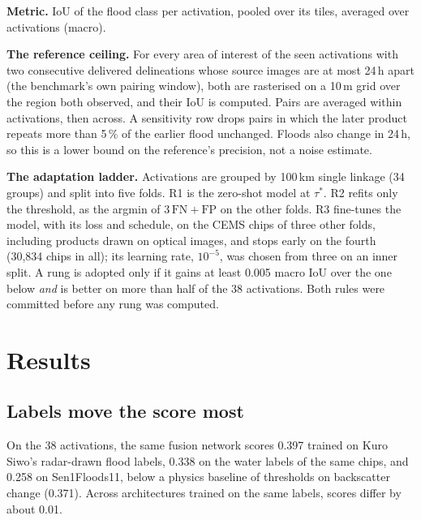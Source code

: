 \documentclass[conference]{IEEEtran}
\newcommand{\tstar}{\ensuremath{\tau^{*}}}
\begin{document}
\textbf{Metric.} IoU of the flood class per activation, pooled over its tiles, averaged over activations (macro).

\textbf{The reference ceiling.} For every area of interest of the seen activations with two consecutive delivered
delineations whose source images are at most 24\,h apart (the benchmark's own pairing window), both are rasterised
on a 10\,m grid over the region both observed, and their IoU is computed. Pairs are averaged within activations,
then across. A sensitivity row drops pairs in which the later product repeats more than 5\,\% of the earlier flood
unchanged. Floods also change in 24\,h, so this is a lower bound on the reference's precision, not a noise estimate.

\textbf{The adaptation ladder.} Activations are grouped by 100\,km single linkage (34 groups) and split into five
folds. R1 is the zero-shot model at \tstar. R2 refits only the threshold, as the argmin of $3\,\mathrm{FN} +
\mathrm{FP}$ on the other folds. R3 fine-tunes the model, with its loss and schedule, on the CEMS chips of three
other folds, including products drawn on optical images, and stops early on the fourth (30,834 chips in all); its
learning rate, $10^{-5}$, was chosen from three on an inner split. A rung is adopted only if it gains at least 0.005
macro IoU over the one below \emph{and} is better on more than half of the 38 activations. Both rules were committed
before any rung was computed.

\section{Results}
\subsection{Labels move the score most}
On the 38 activations, the same fusion network scores 0.397 trained on Kuro Siwo's radar-drawn flood labels, 0.338
on the water labels of the same chips, and 0.258 on Sen1Floods11, below a physics baseline of thresholds on
backscatter change (0.371). Across architectures trained on the same labels, scores differ by about 0.01.
\end{document}
